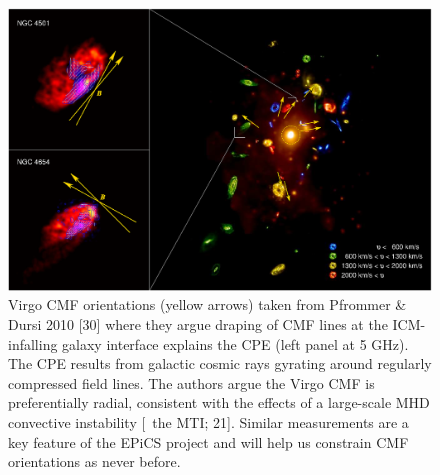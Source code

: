 \begin{figure}
  \begin{center}
    \begin{minipage}{\linewidth}
      \includegraphics*[width=\linewidth, trim=0mm 0mm 0mm 0mm, clip]{pfrommer.ps}
    \end{minipage}
    \caption{Virgo CMF orientations (yellow arrows) taken from
      Pfrommer \& Dursi 2010 [30] where they argue draping of CMF
      lines at the ICM-infalling galaxy interface explains the CPE
      (left panel at 5 GHz). The CPE results from galactic cosmic rays
      gyrating around regularly compressed field lines. The authors
      argue the Virgo CMF is preferentially radial, consistent with
      the effects of a large-scale MHD convective instability
      [\ie\ the MTI; 21]. Similar measurements are a key feature of
      the EPiCS project and will help us constrain CMF orientations as
      never before.}
  \end{center}
\end{figure}

